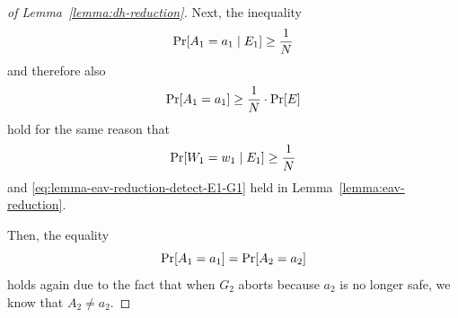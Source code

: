 \begin{proof}[of Lemma~\ref{lemma:dh-reduction}]
	Next, the inequality
	\[
		\pr{A_1 = a_1 \mid E_1} \ge \frac{1}{N}
	\]
	and therefore also
	\begin{equation} \label{eq:lemma-dh-reduction-detect-E1-G1}
		\pr{A_1 = a_1} \ge \frac{1}{N} \cdot \pr{E}
	\end{equation}
	hold for the same reason that
	\[
		\pr{W_1 = w_1 \mid E_1} \ge \frac{1}{N}
	\]
	and \eqref{eq:lemma-eav-reduction-detect-E1-G1} held in Lemma~\ref{lemma:eav-reduction}.

	Then, the equality
	\begin{equation} \label{eq:lemma-dh-reduction-G1-vs-G2}
		\pr{A_1 = a_1} = \pr{A_2 = a_2}
	\end{equation}
	holds again due to the fact that when $G_2$ aborts because $a_2$ is no longer safe, we know that $A_2 \neq a_2$.


\end{proof}
